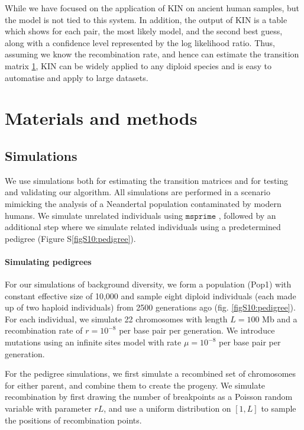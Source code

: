 \documentclass[12pt, letterpaper]{article}
\begin{document}
While we have focused on the application of KIN on ancient human samples, but the model is not tied to this system. In addition, the output of KIN is a table which shows for each pair, the most likely model, and the second best guess, along with a confidence level represented by the log likelihood ratio. Thus, assuming we know the recombination rate, and hence can estimate the transition matrix \ref{method}, KIN can be widely applied to any diploid species  and is easy to automatise and apply to large datasets. 


\section{Materials and methods}\label{method}

\subsection{Simulations}\label{simulat}
We use simulations both for estimating the transition matrices and for testing and validating our algorithm. All simulations are performed in a scenario mimicking the analysis of a Neandertal population contaminated by modern humans. We simulate unrelated individuals using $\texttt{msprime}$ \cite{kelleher_efficient_2016}, followed by an additional step where we simulate related individuals using a predetermined pedigree (Figure S\ref{figS10:pedigree}).

\paragraph{Simulating pedigrees}

For our simulations of background diversity, we form a population (Pop1) with constant effective size of 10,000 and sample eight diploid individuals (each made up of two haploid individuals) from 2500 generations ago (fig. \ref{figS10:pedigree}). For each individual, we simulate 22 chromosomes with length $L=100$ Mb and a recombination rate of $r=10^{-8}$ per base pair per generation. We introduce mutations using an infinite sites model with rate  $\mu= 10^{-8}$ per base pair per generation. 

For the pedigree simulations, we first simulate a recombined set of chromosomes for either parent, and combine them to create the progeny. We simulate recombination by first drawing the number of breakpoints as a  Poisson random variable with parameter $rL$, and use a uniform distribution on $[1, L]$ to sample the positions of recombination points. 
\end{document}
